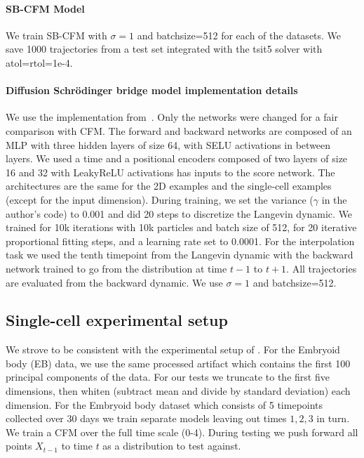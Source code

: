 \documentclass[10pt]{article}
\theoremstyle{plain}
\theoremstyle{definition}
\theoremstyle{remark}
\begin{document}
\paragraph{SB-CFM Model} We train SB-CFM with $\sigma=1$ and batchsize=512 for each of the datasets. We save 1000 trajectories from a test set integrated with the tsit5 solver with atol=rtol=1e-4.

\paragraph{Diffusion Schr\"odinger bridge model implementation details}

We use the implementation from~\citet{de_bortoli_diffusion_2021}. Only the networks were changed for a fair comparison with CFM. The forward and backward networks are composed of an MLP with three hidden layers of size 64, with SELU activations in between layers. We used a time and a positional encoders composed of two layers of size 16 and 32 with LeakyReLU activations has inputs to the score network. The architectures are the same for the 2D examples and the single-cell examples (except for the input dimension). During training, we set the variance ($\gamma$ in the author's code) to 0.001 and did 20 steps to discretize the Langevin dynamic. We trained for 10k iterations with 10k particles and batch size of 512, for 20 iterative proportional fitting steps, and a learning rate set to 0.0001. For the interpolation task we used the tenth timepoint from the Langevin dynamic with the backward network trained to go from the distribution at time $t-1$ to $t+1$. All trajectories are evaluated from the backward dynamic. We use $\sigma=1$ and batchsize=512.

\subsection{Single-cell experimental setup}

We strove to be consistent with the experimental setup of \citet{tong_trajectorynet_2020}. For the Embryoid body (EB) data, we use the same processed artifact which contains the first 100 principal components of the data. For our tests we truncate to the first five dimensions, then whiten (subtract mean and divide by standard deviation) each dimension. For the Embryoid body dataset which consists of 5 timepoints collected over 30 days we train separate models leaving out times $1,2,3$ in turn. We train a CFM over the full time scale (0-4). During testing we push forward all points $X_{t-1}$ to time $t$ as a distribution to test against.
\end{document}
